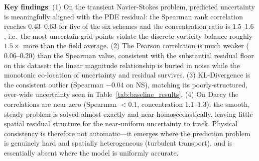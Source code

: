 \begin{table}[htbp]
\centering
\caption{Physical consistency of predicted uncertainty. The concentration ratio is the mean PDE residual
within the top-5\% most uncertain grid points, relative to the field mean; values $>$ 1 indicate
high-uncertainty regions coincide with physics violation. All values are averaged over the test set.}
\label{tab:physics_consistency}
\end{table}

\textbf{Key findings}: (1) On the transient Navier-Stokes problem, predicted uncertainty is meaningfully
aligned with the PDE residual: the Spearman rank correlation reaches $0.43$--$0.63$ for five of the six
schemes and the concentration ratio is $1.5$--$1.6$, i.e.\ the most uncertain grid points violate the
discrete vorticity balance roughly $1.5\times$ more than the field average. (2) The Pearson correlation is
much weaker ($0.06$--$0.20$) than the Spearman value, consistent with the substantial residual floor on
this dataset: the linear magnitude relationship is buried in noise while the monotonic co-location of
uncertainty and residual survives. (3) KL-Divergence is the consistent outlier (Spearman $-0.04$ on NS),
matching its poorly-structured, over-wide uncertainty seen in Table~\ref{tab:baseline_results}. (4) On
Darcy the correlations are near zero (Spearman $<0.1$, concentration $1.1$--$1.3$): the smooth,
steady problem is solved almost exactly and near-homoscedastically, leaving little spatial residual
structure for the near-uniform uncertainty to track. Physical consistency is therefore not automatic---it
emerges where the prediction problem is genuinely hard and spatially heterogeneous (turbulent transport),
and is essentially absent where the model is uniformly accurate.

